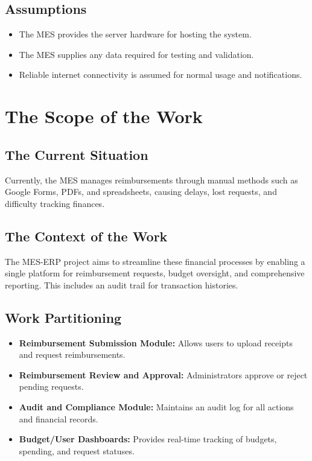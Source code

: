 \documentclass[12pt]{article}
\begin{document}
\subsection{Assumptions}
\begin{itemize}
  \item The MES provides the server hardware for hosting the system.
  \item The MES supplies any data required for testing and validation.
  \item Reliable internet connectivity is assumed for normal usage and notifications.
\end{itemize}

\section{The Scope of the Work}
\subsection{The Current Situation}
Currently, the MES manages reimbursements through manual methods such as Google Forms, PDFs, and spreadsheets, causing delays, lost requests, and difficulty tracking finances.

\subsection{The Context of the Work}
The MES-ERP project aims to streamline these financial processes by enabling a single platform for reimbursement requests, budget oversight, and comprehensive reporting. This includes an audit trail for transaction histories.

\subsection{Work Partitioning}
\begin{itemize}
  \item \textbf{Reimbursement Submission Module:} Allows users to upload receipts and request reimbursements.
  \item \textbf{Reimbursement Review and Approval:} Administrators approve or reject pending requests.
  \item \textbf{Audit and Compliance Module:} Maintains an audit log for all actions and financial records.
  \item \textbf{Budget/User Dashboards:} Provides real-time tracking of budgets, spending, and request statuses.
\end{itemize}
\end{document}
